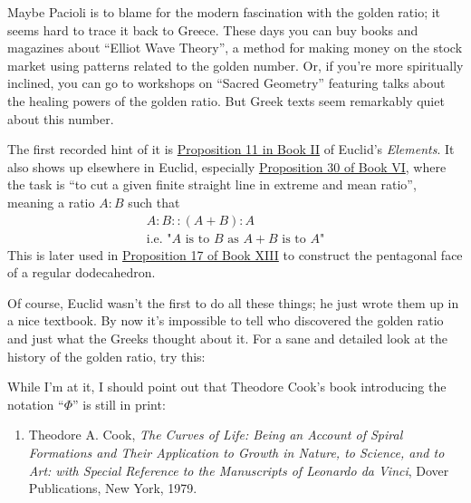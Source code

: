 \documentclass{article}
\def\tightlist{}
\renewcommand{\texttt}[1]{%
  \begingroup
  \ttfamily
  \begingroup\lccode`~=`/\lowercase{\endgroup\def~}{/\discretionary{}{}{}}%
  \begingroup\lccode`~=`[\lowercase{\endgroup\def~}{[\discretionary{}{}{}}%
  \begingroup\lccode`~=`.\lowercase{\endgroup\def~}{.\discretionary{}{}{}}%
  \catcode`/=\active\catcode`[=\active\catcode`.=\active
  \scantokens{#1\noexpand}%
  \endgroup
}
\begin{document}
Maybe Pacioli is to blame for the modern fascination with the golden
ratio; it seems hard to trace it back to Greece. These days you can buy
books and magazines about ``Elliot Wave Theory'', a method for making
money on the stock market using patterns related to the golden number.
Or, if you're more spiritually inclined, you can go to workshops on
``Sacred Geometry'' featuring talks about the healing powers of the
golden ratio. But Greek texts seem remarkably quiet about this number.

The first recorded hint of it is
\href{http://aleph0.clarku.edu/~djoyce/java/elements/bookII/propII11.html}{Proposition
11 in Book II} of Euclid's \emph{Elements}. It also shows up elsewhere
in Euclid, especially
\href{http://aleph0.clarku.edu/~djoyce/java/elements/bookVI/propVI30.html}{Proposition
30 of Book VI}, where the task is ``to cut a given finite straight line
in extreme and mean ratio'', meaning a ratio \(A:B\) such that \[
  \begin{gathered}
    A:B :: (A+B):A
  \\\mbox{i.e. "$A$ is to $B$ as $A+B$ is to $A$"}
  \end{gathered}
\] This is later used in
\href{http://aleph0.clarku.edu/~djoyce/java/elements/bookXIII/propXIII17.html}{Proposition
17 of Book XIII} to construct the pentagonal face of a regular
dodecahedron.

Of course, Euclid wasn't the first to do all these things; he just wrote
them up in a nice textbook. By now it's impossible to tell who
discovered the golden ratio and just what the Greeks thought about it.
For a sane and detailed look at the history of the golden ratio, try
this:


While I'm at it, I should point out that Theodore Cook's book
introducing the notation ``\(\Phi\)'' is still in print:

\begin{enumerate}
\def\labelenumi{\arabic{enumi})}
\setcounter{enumi}{1}
\tightlist
\item
  Theodore A. Cook, \emph{The Curves of Life: Being an Account of Spiral
  Formations and Their Application to Growth in Nature, to Science, and
  to Art: with Special Reference to the Manuscripts of Leonardo da
  Vinci}, Dover Publications, New York, 1979.
\end{enumerate}
\end{document}
